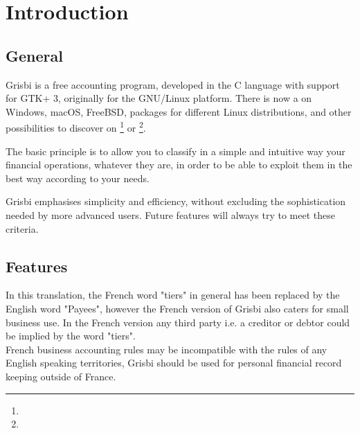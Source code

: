 







\chapter{Introduction\label{introduction}}

\section{General \label{introduction-General}}

Grisbi is a free accounting program, developed in the \gls{C} language with support for \gls{GTK}+ 3, originally for the \gls{GNU/Linux} platform. There is now a  on \gls{Windows}, \gls{macOS}, FreeBSD, packages for different  \gls{Linux distributions}, and other possibilities to discover on \footnote{\urlGrisbi{}} or \footnote{\urlSourceForge{}}.

The basic principle is to allow you to classify in a simple and intuitive way your financial operations, whatever they are, in order to be able to exploit them in the best way according to your needs.

Grisbi emphasises simplicity and efficiency, without excluding the sophistication needed by more advanced users. Future features will always try to meet these criteria.

\section{Features\label{introduction-features}}

 In this translation, the French word "tiers" in general has been replaced by the English word "Payees", however the French version of Grisbi also caters for small business use. In the French version any third party i.e. a creditor or debtor could be implied by the word "tiers".\\
\textcolor{red}{} French business accounting rules may be incompatible with the rules of any English speaking territories, Grisbi should be used  for personal financial record keeping outside of France.



